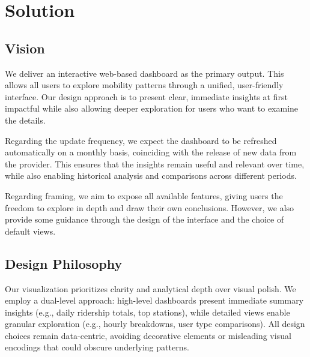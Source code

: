 \section{Solution}
\subsection{Vision}
We deliver an interactive web-based dashboard as the primary output.
This allows all users to explore mobility patterns through a unified, user-friendly interface.
Our design approach is to present clear, immediate insights at first impactful while also allowing deeper exploration for users who want to examine the details.

Regarding the update frequency, we expect the dashboard to be refreshed automatically on a monthly basis, coinciding with the release of new data from the provider.
This ensures that the insights remain useful and relevant over time, while also enabling historical analysis and comparisons across different periods.

Regarding framing, we aim to expose all available features, giving users the freedom to explore in depth and draw their own conclusions.
However, we also provide some guidance through the design of the interface and the choice of default views.

\subsection{Design Philosophy}
Our visualization prioritizes clarity and analytical depth over visual polish.
We employ a dual-level approach: high-level dashboards present immediate summary insights (e.g., daily ridership totals, top stations), while detailed views enable granular exploration (e.g., hourly breakdowns, user type comparisons).
All design choices remain data-centric, avoiding decorative elements or misleading visual encodings that could obscure underlying patterns.

